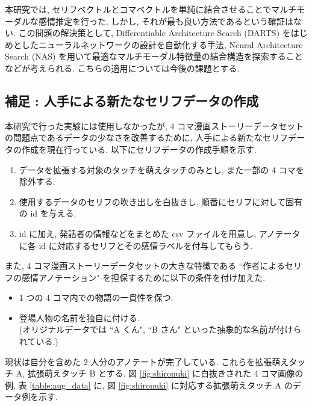 本研究では, セリフベクトルとコマベクトルを単純に結合させることでマルチモーダルな感情推定を行った. しかし, それが最も良い方法であるという確証はない. この問題の解決策として, Differentiable Architecture Search (DARTS) \cite{DBLP:journals/corr/abs-1806-09055} をはじめとしたニューラルネットワークの設計を自動化する手法, Neural Architecture Search (NAS) を用いて最適なマルチモーダル特徴量の結合構造を探索することなどが考えられる. こちらの適用については今後の課題とする.

\changeindent{0cm}
\subsection{補足 : 人手による新たなセリフデータの作成}
\changeindent{2cm}

本研究で行った実験には使用しなかったが, 4 コマ漫画ストーリーデータセットの問題点であるデータの少なさを改善するために, 人手による新たなセリフデータの作成を現在行っている. 以下にセリフデータの作成手順を示す.

\begin{enumerate}
  \item データを拡張する対象のタッチを萌えタッチのみとし, また一部の 4 コマを除外する.
  \item 使用するデータのセリフの吹き出しを白抜きし, 順番にセリフに対して固有の id を与える.
  \item id に加え, 発話者の情報などをまとめた csv ファイルを用意し, アノテータに各 id に対応するセリフとその感情ラベルを付与してもらう.
\end{enumerate}

また, 4 コマ漫画ストーリーデータセットの大きな特徴である ``作者によるセリフの感情アノテーション" を担保するために以下の条件を付け加えた.

\begin{itemize}
  \item 1 つの 4 コマ内での物語の一貫性を保つ.
  \item 登場人物の名前を独自に付ける. \\ (オリジナルデータでは ``A くん", ``B さん" といった抽象的な名前が付けられている.)
\end{itemize}

\newpage
現状は自分を含めた 2 人分のアノテートが完了している. これらを拡張萌えタッチ A, 拡張萌えタッチ B とする. 図 \ref{fig:shironuki} に白抜きされた 4 コマ画像の例, 表 \ref{table:aug_data} に, 図 \ref{fig:shironuki} に対応する拡張萌えタッチ A のデータ例を示す.

